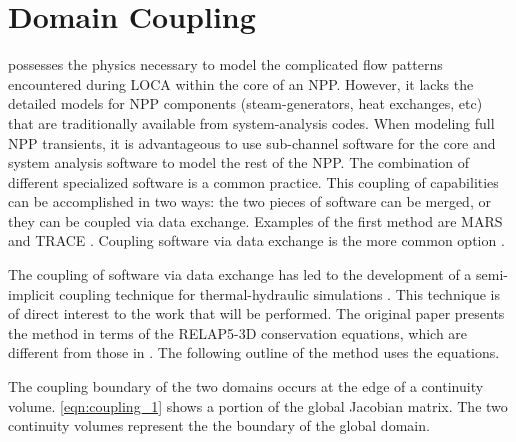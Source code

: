 \section{Domain Coupling}
\label{sect:code_coupling}

\cobra{} possesses the physics necessary to model the complicated flow patterns encountered during LOCA within the core of an NPP.
However, it lacks the detailed models for NPP components (steam-generators, heat exchanges, etc) that are traditionally available from system-analysis codes.
When modeling full NPP transients, it is advantageous to use sub-channel software for the core and system analysis software to model the rest of the NPP.
The combination of different specialized software is a common practice.
This coupling of capabilities can be accomplished in two ways: the two pieces of software can be merged, or they can be coupled via data exchange.
Examples of the first method are MARS \cite{Jeong2008} and TRACE \cite{TRACE}.
Coupling software via data exchange is the more common option \cite{Makihara2003, Aumiller2002, Aumiller2001, Avramova2006, Weaver2002}.

The coupling of software via data exchange has led to the development of a semi-implicit coupling technique for thermal-hydraulic simulations \cite{Weaver2002}.
This technique is of direct interest to the work that will be performed.
The original paper presents the method in terms of the RELAP5-3D conservation equations, which are different from those in \cobra{}.
The following outline of the method uses the \cobra{} equations.

The coupling boundary of the two domains occurs at the edge of a continuity volume.
\eqref{eqn:coupling_1} shows a portion of the global Jacobian matrix.
The two continuity volumes represent the the boundary of the global domain.

